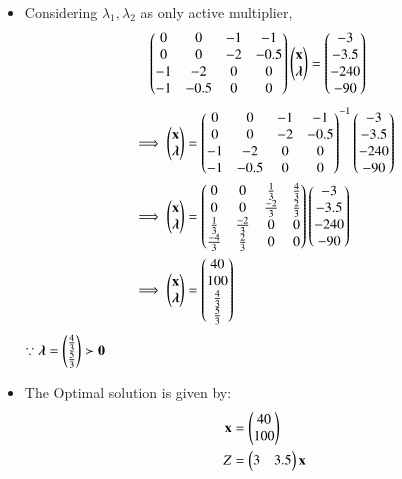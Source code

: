 \begin{itemize}
\begin{align}
\end{align}
\item Considering $\lambda_1,\lambda_2$ as only active multiplier,
\begin{align}
    \begin{pmatrix}0 & 0 & -1 & -1  \\ 0 & 0 & -2 & -0.5 \\ -1 & -2 & 0 & 0 \\-1 & -0.5 & 0 & 0\end{pmatrix}\begin{pmatrix}\mathbf{x}\\ \boldsymbol{\lambda}\end{pmatrix} &= \begin{pmatrix}-3 \\ -3.5 \\ -240 \\ -90\end{pmatrix}
\end{align}
\begin{align}
 \implies   \begin{pmatrix}\mathbf{x} \\ \boldsymbol{\lambda}\end{pmatrix} &=  \begin{pmatrix}0 & 0 & -1 & -1  \\ 0 & 0 & -2 & -0.5 \\ -1 & -2 & 0 & 0 \\-1 & -0.5 & 0 & 0\end{pmatrix}^{-1}\begin{pmatrix}-3 \\ -3.5 \\ -240 \\ -90\end{pmatrix}
    \\
    \implies   \begin{pmatrix}\mathbf{x} \\ \boldsymbol{\lambda}\end{pmatrix} &= \begin{pmatrix}0 & 0 & \frac{1}{3} & \frac{4}{3} \\ 0 & 0 & \frac{-2}{3} & \frac{2}{3} \\ \frac{1}{3} & \frac{-2}{3} & 0 & 0 \\ \frac{-4}{3} & \frac{2}{3} & 0 & 0\end{pmatrix}\begin{pmatrix}-3 \\ -3.5 \\ -240 \\ -90\end{pmatrix}
    \\
    \implies \begin{pmatrix}\mathbf{x} \\ \boldsymbol{\lambda}\end{pmatrix} &= \begin{pmatrix}40 \\100 \\ \frac{4}{3} \\ \frac{5}{3} \end{pmatrix}
\end{align}
$\because \boldsymbol{\lambda}=\begin{pmatrix}\frac{4}{3} \\ \frac{5}{3}\end{pmatrix} \succ \mathbf{0}$
\\
\item The Optimal solution is given by:
\begin{align}
    \vec{x} &= \myvec{40\\100} \\
    Z &= \myvec{3&3.5}\vec{x} \\

\end{align}
\end{itemize}
